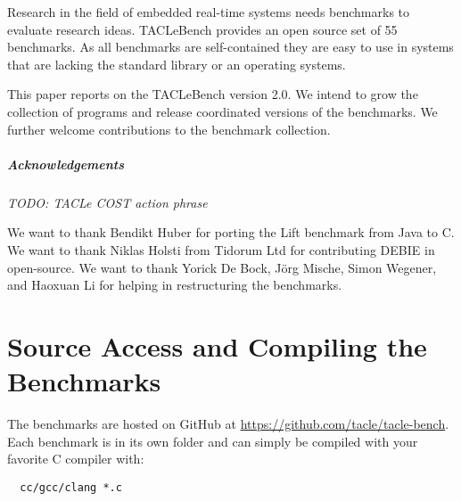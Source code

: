 \documentclass[a4paper,UKenglish]{oasics}
\newcommand{\todo}[1]{{\emph{TODO: #1}}}
\newcommand{\benchcount}{55 }
\begin{document}
Research in the field of embedded real-time systems needs benchmarks to
evaluate research ideas. TACLeBench provides an open source set of
\benchcount benchmarks. As all benchmarks are self-contained they are easy to
use in systems that are lacking the standard library or an operating systems.

This paper reports on the TACLeBench version 2.0. We intend to grow the
collection of programs and release coordinated versions of the benchmarks.
We further welcome contributions to the benchmark collection.



\subparagraph*{Acknowledgements}

\todo{TACLe COST action phrase}

We want to thank Bendikt Huber for porting the Lift benchmark from Java to C.
We want to thank Niklas Holsti from Tidorum Ltd for contributing DEBIE in open-source.
We want to thank Yorick De Bock, J{\"o}rg Mische, Simon Wegener, and Haoxuan Li for helping in restructuring the benchmarks.

\appendix
\section{Source Access and Compiling the Benchmarks}

The benchmarks are hosted on GitHub at \url{https://github.com/tacle/tacle-bench}.
Each benchmark is in its own folder and can simply be compiled with your favorite
C compiler with:

\begin{verbatim}
  cc/gcc/clang *.c
\end{verbatim}




\end{document}
